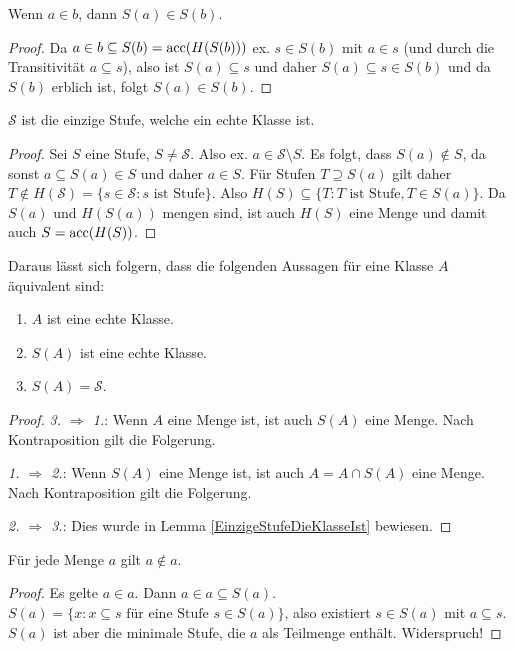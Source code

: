 \begin{lemma}
	Wenn $a\in b$, dann $S(a)\in S(b)$.
\end{lemma}
\begin{proof}
	Da $a\in b \subseteq S(b)=\operatorname{acc}(H(S(b)))$ ex. $s\in S(b)$ mit $a\in s$ (und durch die Transitivität $a\subseteq s$), also ist $S(a)\subseteq s$ und daher $S(a)\subseteq s \in S(b)$ und da $S(b)$ erblich ist, folgt $S(a)\in S(b)$.
\end{proof}

\begin{lemma}
	$\mathcal{S}$ ist die einzige Stufe, welche ein echte Klasse ist.
	\label{EinzigeStufeDieKlasseIst}
\end{lemma}
\begin{proof}
	Sei $S$ eine Stufe, $S\neq \mathcal{S}$. Also ex. $a\in \mathcal{S}\setminus S$. Es folgt, dass $S(a)\notin S$, da sonst $a\subseteq S(a)\in S$ und daher $a\in S$. 
	Für Stufen $T \supseteq S(a)$ gilt daher $T \notin H(\mathcal{S})=\{s\in \mathcal{S} : s \text{ ist Stufe}\}$. Also $H(S)\subseteq\{T : T \text{ ist Stufe}, T \in S(a)\}$. Da $S(a)$ und $H(S(a))$ mengen sind, ist auch $H(S)$ eine Menge und damit auch $S=\operatorname{acc}(H(S))$.
\end{proof}

Daraus lässt sich folgern, dass die folgenden Aussagen für eine Klasse $A$ äquivalent sind:
\begin{enumerate}
	\item $A$ ist eine echte Klasse.
	\item $S(A)$ ist eine echte Klasse.
	\item $S(A)=\mathcal{S}$.
\end{enumerate}
\begin{proof}
	\textit{3. $\Rightarrow$ 1.}: Wenn $A$ eine Menge ist, ist auch $S(A)$ eine Menge. Nach Kontraposition gilt die Folgerung.
	
	\textit{1. $\Rightarrow$ 2.}: Wenn $S(A)$ eine Menge ist, ist auch $A=A\cap S(A)$ eine Menge. Nach Kontraposition gilt die Folgerung.
	
	\textit{2. $\Rightarrow$ 3.}: Dies wurde in Lemma \ref{EinzigeStufeDieKlasseIst} bewiesen.
\end{proof}

\begin{satz}
	Für jede Menge $a$ gilt $a\notin a$.
\end{satz}
\begin{proof}
	Es gelte $a\in a$. Dann $a\in a \subseteq S(a)$. $S(a)=\{x : x\subseteq s \text{ für eine Stufe } s\in S(a)\}$, also existiert $s\in S(a)$ mit $a\subseteq s$. $S(a)$ ist aber die minimale Stufe, die $a$ als Teilmenge enthält. Widerspruch!
\end{proof}

